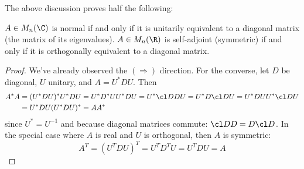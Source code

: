 The above discussion proves half the following:

\begin{thm}{}{}
$A\in M_n(\C)$ is normal if and only if it is unitarily equivalent to a diagonal matrix (the matrix of its eigenvalues).\smallbreak
$A\in M_n(\R)$ is self-adjoint (symmetric) if and only if it is orthogonally equivalent to a diagonal matrix. 
\end{thm}

\begin{proof}
We've already observed the $(\Rightarrow)$ direction.\smallbreak
For the converse, let $D$ be diagonal, $U$ unitary, and $A=U^*DU$. Then
\begin{align*}
A^*A&=(U^*DU)^*U^*DU=U^*D^*UU^*DU=U^*\cl DDU=U^*D\cl DU =U^*DUU^*\cl DU\\
&=U^*DU(U^*DU)^* =AA^*
\end{align*}
since $U^*=U^{-1}$ and because diagonal matrices commute: $\cl DD=D\cl D$.\smallbreak
In the special case where $A$ is real and $U$ is orthogonal, then $A$ is symmetric:
\[A^T=(U^TDU)^T=U^TD^TU=U^TDU=A\tag*{\qedhere}\]
\end{proof}

\goodbreak



